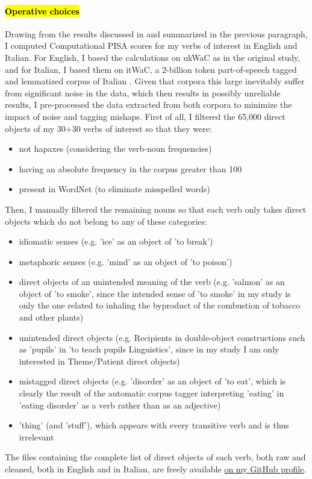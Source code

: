 \paragraph{\hl{Operative choices}}
Drawing from the results discussed in \textcite{CappelliLenciPISA} and summarized in the previous paragraph, I computed Computational PISA scores for my verbs of interest in English and Italian. For English, I based the calculations on ukWaC as in the original study, and for Italian, I based them on itWaC, a 2-billion token part-of-speech tagged and lemmatized corpus of Italian \parencite{baroni2009wacky}. Given that corpora this large inevitably suffer from significant noise in the data, which then results in possibly unreliable results, I pre-processed the data extracted from both corpora to minimize the impact of noise and tagging mishaps. First of all, I filtered the 65,000 direct objects of my 30+30 verbs of interest so that they were:
\begin{itemize}
    \item not hapaxes (considering the verb-noun frequencies)
    \item having an absolute frequency in the corpus greater than 100
    \item present in WordNet (to eliminate misspelled words)
\end{itemize}
Then, I manually filtered the remaining nouns so that each verb only takes direct objects which do not belong to any of these categories:
\begin{itemize}
    \item idiomatic senses (e.g. 'ice' as an object of 'to break')
    \item metaphoric senses (e.g. 'mind' as an object of 'to poison')
    \item direct objects of an unintended meaning of the verb (e.g. 'salmon' as an object of 'to smoke', since the intended sense of 'to smoke' in my study is only the one related to inhaling the byproduct of the combustion of tobacco and other plants)
    \item unintended direct objects (e.g. Recipients in double-object constructions such as 'pupils' in 'to teach pupils Linguistics', since in my study I am only interested in Theme/Patient direct objects)
    \item mistagged direct objects (e.g. 'disorder' as an object of 'to eat', which is clearly the result of the automatic corpus tagger interpreting 'eating' in 'eating disorder' as a verb rather than as an adjective)
    \item 'thing' (and 'stuff'), which appears with every transitive verb and is thus irrelevant
\end{itemize}
The files containing the complete list of direct objects of each verb, both raw and cleaned, both in English and in Italian, are freely available \href{https://github.com/giuliacappelli/dissertationData}{on my GitHub profile}.\\

